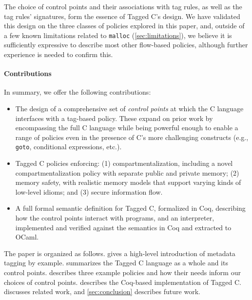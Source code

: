 The choice of control points and their associations with tag rules, as well as the tag rules'
signatures, form the essence of Tagged C's design. 
We have validated this design on the three classes of policies explored in this paper,
and, outside of a few known limitations related to {\tt malloc} (\cref{sec:limitations}), %
we believe it is sufficiently expressive to describe most other flow-based policies, although 
further experience is needed to confirm this.

\paragraph*{Contributions}

In summary, we offer the following contributions:

\begin{itemize}
\item The design of a comprehensive set of {\em control points} at which the C language interfaces
  with a tag-based policy. These expand on prior work by encompassing the full C language
  while being powerful enough to enable a range of policies even in the presence of C's more challenging
  constructs (e.g., {\tt goto}, conditional expressions, etc.).
\item Tagged C policies enforcing: (1) compartmentalization, including a novel compartmentalization policy
  with separate public and private memory; (2) memory safety, with realistic memory models that support
  varying kinds of low-level idioms; and (3) secure information flow.
\item A full formal semantic definition for Tagged C, formalized in Coq, describing how the
  control points interact with programs, and an interpreter, implemented and verified against
  the semantics in Coq and extracted to OCaml.
\end{itemize}

The paper is organized as follows.
 gives a high-level introduction of metadata tagging by example.
 summarizes the Tagged C language as a whole and its control points.
 describes three example policies and how their
needs inform our choices of control points. 
 describes the Coq-based implementation of Tagged C.
 discusses related work, and \cref{sec:conclusion}
describes future work.


